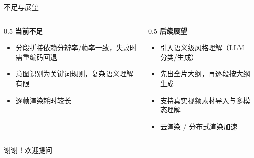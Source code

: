 \documentclass[aspectratio=169,11pt]{beamer}
\begin{document}
\begin{frame}{不足与展望}
  \begin{columns}[T]
    \begin{column}{0.5\textwidth}
      \textbf{当前不足}
      \begin{itemize}
        \item 分段拼接依赖分辨率/帧率一致，失败时需重编码回退
        \item 意图识别为关键词规则，复杂语义理解有限
        \item 逐帧渲染耗时较长
      \end{itemize}
    \end{column}
    \begin{column}{0.5\textwidth}
      \textbf{后续展望}
      \begin{itemize}
        \item 引入语义级风格理解（LLM 分类/生成）
        \item 先出全片大纲，再逐段按大纲生成
        \item 支持真实视频素材导入与多模态理解
        \item 云渲染 / 分布式渲染加速
      \end{itemize}
    \end{column}
  \end{columns}
  \vspace{1em}
  \begin{center}
    \Large 谢谢！欢迎提问
  \end{center}
\end{frame}
\end{document}
